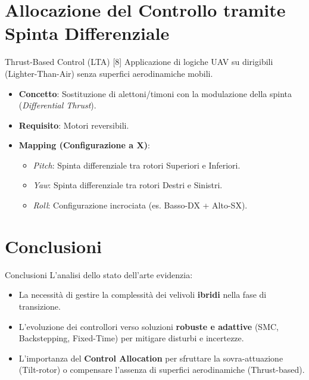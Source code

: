 \documentclass[aspectratio=169]{beamer}
\begin{document}
\section{Allocazione del Controllo tramite Spinta Differenziale}

\begin{frame}{Thrust-Based Control (LTA) [8]}
    Applicazione di logiche UAV su dirigibili (Lighter-Than-Air) senza superfici aerodinamiche mobili.
    \vspace{0.3cm}
    \begin{itemize}
        \item \textbf{Concetto}: Sostituzione di alettoni/timoni con la modulazione della spinta (\textit{Differential Thrust}).
        \item \textbf{Requisito}: Motori reversibili.
        \item \textbf{Mapping (Configurazione a X)}:
        \begin{itemize}
            \item \textit{Pitch}: Spinta differenziale tra rotori Superiori e Inferiori.
            \item \textit{Yaw}: Spinta differenziale tra rotori Destri e Sinistri.
            \item \textit{Roll}: Configurazione incrociata (es. Basso-DX + Alto-SX).
        \end{itemize}
    \end{itemize}
\end{frame}

\section{Conclusioni}

\begin{frame}{Conclusioni}
    L'analisi dello stato dell'arte evidenzia:
    \begin{itemize}
        \item La necessità di gestire la complessità dei velivoli \textbf{ibridi} nella fase di transizione.
        \item L'evoluzione dei controllori verso soluzioni \textbf{robuste e adattive} (SMC, Backstepping, Fixed-Time) per mitigare disturbi e incertezze.
        \item L'importanza del \textbf{Control Allocation} per sfruttare la sovra-attuazione (Tilt-rotor) o compensare l'assenza di superfici aerodinamiche (Thrust-based).
    \end{itemize}
\end{frame}
\end{document}
